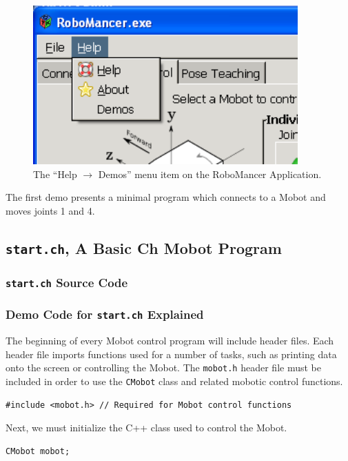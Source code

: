 \documentclass{article}
\begin{document}
\begin{figure}
  \centering
  \includegraphics[width=4in]{images/help_demos_screenshot.png}
  \caption{The ``Help $\rightarrow$ Demos'' menu item on the RoboMancer Application.}
  \label{fig:help_demos_screenshot}
\end{figure}


The first demo presents a minimal program which connects to a Mobot and
moves joints 1 and 4.

\subsection{\texttt{start.ch}, A Basic Ch Mobot Program}
\subsubsection{\texttt{start.ch} Source Code}


\subsubsection{\label{sec:democode}Demo Code for \texttt{start.ch} Explained}
The beginning of every Mobot control program will include header files. Each
header file imports functions used for a number of tasks, such as printing
data onto the screen or controlling the Mobot. The \texttt{mobot.h} header
file must be included in order to use the \texttt{CMobot} class and related
mobotic control functions.

\begin{verbatim}
#include <mobot.h> // Required for Mobot control functions
\end{verbatim}

Next, we must initialize the C++ class used to control the Mobot. 

\begin{verbatim}
CMobot mobot;
\end{verbatim}
\end{document}
